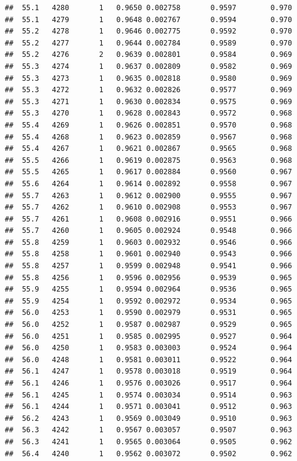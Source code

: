 \documentclass[
]{book}
\begin{document}
\begin{verbatim}
##  55.1   4280       1   0.9650 0.002758       0.9597        0.970
##  55.1   4279       1   0.9648 0.002767       0.9594        0.970
##  55.2   4278       1   0.9646 0.002775       0.9592        0.970
##  55.2   4277       1   0.9644 0.002784       0.9589        0.970
##  55.2   4276       2   0.9639 0.002801       0.9584        0.969
##  55.3   4274       1   0.9637 0.002809       0.9582        0.969
##  55.3   4273       1   0.9635 0.002818       0.9580        0.969
##  55.3   4272       1   0.9632 0.002826       0.9577        0.969
##  55.3   4271       1   0.9630 0.002834       0.9575        0.969
##  55.3   4270       1   0.9628 0.002843       0.9572        0.968
##  55.4   4269       1   0.9626 0.002851       0.9570        0.968
##  55.4   4268       1   0.9623 0.002859       0.9567        0.968
##  55.4   4267       1   0.9621 0.002867       0.9565        0.968
##  55.5   4266       1   0.9619 0.002875       0.9563        0.968
##  55.5   4265       1   0.9617 0.002884       0.9560        0.967
##  55.6   4264       1   0.9614 0.002892       0.9558        0.967
##  55.7   4263       1   0.9612 0.002900       0.9555        0.967
##  55.7   4262       1   0.9610 0.002908       0.9553        0.967
##  55.7   4261       1   0.9608 0.002916       0.9551        0.966
##  55.7   4260       1   0.9605 0.002924       0.9548        0.966
##  55.8   4259       1   0.9603 0.002932       0.9546        0.966
##  55.8   4258       1   0.9601 0.002940       0.9543        0.966
##  55.8   4257       1   0.9599 0.002948       0.9541        0.966
##  55.8   4256       1   0.9596 0.002956       0.9539        0.965
##  55.9   4255       1   0.9594 0.002964       0.9536        0.965
##  55.9   4254       1   0.9592 0.002972       0.9534        0.965
##  56.0   4253       1   0.9590 0.002979       0.9531        0.965
##  56.0   4252       1   0.9587 0.002987       0.9529        0.965
##  56.0   4251       1   0.9585 0.002995       0.9527        0.964
##  56.0   4250       1   0.9583 0.003003       0.9524        0.964
##  56.0   4248       1   0.9581 0.003011       0.9522        0.964
##  56.1   4247       1   0.9578 0.003018       0.9519        0.964
##  56.1   4246       1   0.9576 0.003026       0.9517        0.964
##  56.1   4245       1   0.9574 0.003034       0.9514        0.963
##  56.1   4244       1   0.9571 0.003041       0.9512        0.963
##  56.2   4243       1   0.9569 0.003049       0.9510        0.963
##  56.3   4242       1   0.9567 0.003057       0.9507        0.963
##  56.3   4241       1   0.9565 0.003064       0.9505        0.962
##  56.4   4240       1   0.9562 0.003072       0.9502        0.962

\end{verbatim}
\end{document}
